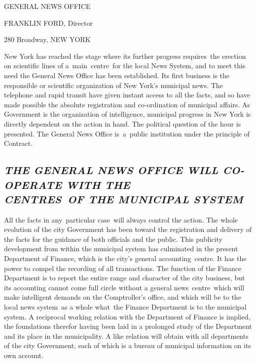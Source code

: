 \documentclass[openany,nobib]{tufte-book}
\begin{document}
\vspace{0.8in}

\begin{center}
    {\LARGE GENERAL NEWS OFFICE}

    \vspace{.3in}

    {\Large FRANKLIN FORD, Director}

    \vspace{.3in}

    {\large 280 Broadway, NEW YORK}
    
\end{center}

\vspace{.5in}

 New York has reached the stage where its further
progress requires~the erection on scientific lines of a~main~centre~for
the local News System, and to meet this need the General News Office has
been established. Its first business is the responsible or scientific
organization of New York's municipal news. The telephone and rapid
transit have given instant access to all the facts, and so have made
possible the absolute registration and co-ordination of municipal
affairs. As Government is the organization of intelligence, municipal
progress in New York is directly dependent on the action in hand. The
political question of the hour is presented. The General News Office
is~a~public institution under the principle of Contract.~

\hypertarget{the-general-news-office-will-co-operate-with-the-centres-of-the-municipal-system}{%
\subsection{\emph{THE GENERAL NEWS OFFICE WILL CO-OPERATE WITH THE\\\noindent CENTRES~OF
THE MUNICIPAL
SYSTEM}}\label{the-general-news-office-will-co-operate-with-the-centres-of-the-municipal-system}}

All the facts in any~particular case~will always control the action. The
whole evolution of the city Government has been toward the registration
and delivery of the facts for the guidance of both officials and the
public. This publicity development from within the municipal system has
culminated in the present Department of Finance, which is the city's
general accounting~centre. It has the power to compel the recording of
all transactions. The function of the Finance Department is to report
the entire range and character of the city business, but its accounting
cannot come full circle without a general news~centre~which will make
intelligent demands on the Comptroller's office, and which will be to
the local news system~as a whole what~the Finance Department is to the
municipal system. A reciprocal working relation with the Department of
Finance is implied, the foundations therefor having been laid in a
prolonged study of the Department and its place in the municipality. A
like relation will obtain with all departments of the city Government,
each of which is a bureau of municipal information on its own account.~
\end{document}

